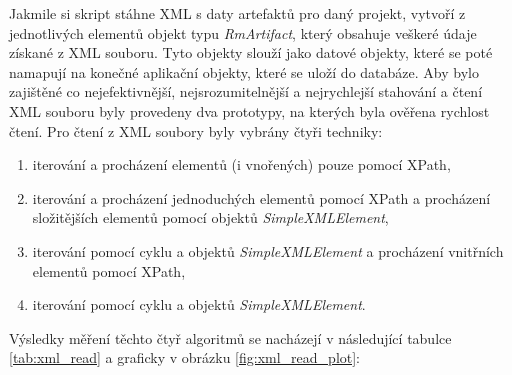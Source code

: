 \documentclass[czech,master,public,dept460,male,cpdeclaration,oneside]{diploma}
\begin{document}
Jakmile si skript stáhne XML s daty artefaktů pro daný projekt, vytvoří z jednotlivých elementů objekt typu \textit{RmArtifact}, který obsahuje veškeré údaje získané z XML souboru. Tyto objekty slouží jako datové objekty, které se poté namapují na konečné aplikační objekty, které se uloží do databáze. Aby bylo zajištěné co nejefektivnější, nejsrozumitelnější a nejrychlejší stahování a čtení XML souboru byly provedeny dva prototypy, na kterých byla ověřena rychlost čtení. Pro čtení z XML soubory byly vybrány čtyři techniky:

\begin{enumerate}
\item iterování a procházení elementů (i vnořených) pouze pomocí XPath,
\item iterování a procházení jednoduchých elementů pomocí XPath a procházení složitějších elementů pomocí objektů \textit{SimpleXMLElement},
\item iterování pomocí cyklu a objektů \textit{SimpleXMLElement} a procházení vnitřních elementů pomocí XPath,
\item iterování pomocí cyklu a objektů \textit{SimpleXMLElement}.
\end{enumerate}

Výsledky měření těchto čtyř algoritmů se nacházejí v následující tabulce \ref{tab:xml_read} a graficky v obrázku \ref{fig:xml_read_plot}:
\end{document}

